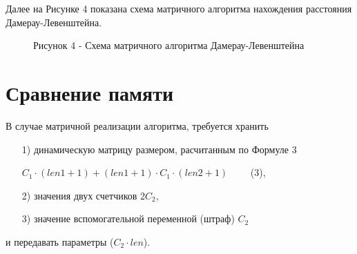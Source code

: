 \documentclass[12pt]{report}
\begin{document}
\newpage
Далее на Рисунке 4 показана схема матричного алгоритма нахождения расстояния Дамерау-Левенштейна.
\begin{figure}[h!]
	\caption*{Рисунок 4 - Схема матричного алгоритма Дамерау-Левенштейна}
\end{figure}

\section{Сравнение памяти}
В случае матричной реализации алгоритма, требуется хранить
\begin{enumerate}
	\item[1)] динамическую матрицу размером, расчитанным по Формуле 3 \par
	 $C_1 \cdot (len1 + 1) + (len1 + 1) \cdot C_1 \cdot (len2 + 1)\qquad$ (3),
	\item[2)] значения двух счетчиков 2$C_2$,
	\item[3)] значение вспомогательной переменной (штраф) $C_2$
\end{enumerate}
и передавать параметры ($C_2 \cdot len$).
\end{document}
